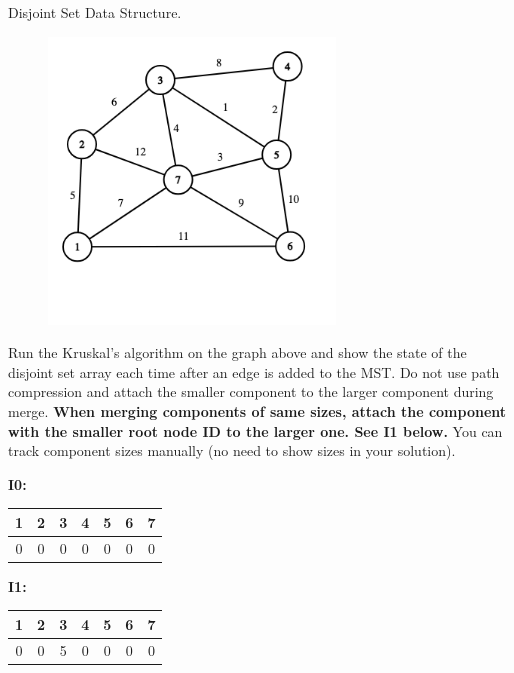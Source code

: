 \documentclass[12pt]{exam}
\newcommand{\stars}[1]{%
    \foreach \n in {1,...,#1}{%
        $\filledstar$%
    }%
}
\begin{document}
\begin{questions}
\begin{parts}
    \end{parts}
    \clearpage

    \question[10] [W5, \stars{1}] Disjoint Set Data Structure.

    \vspace*{-0.2cm}
    \begin{figure}[h]
        \center
        \includegraphics[width = 3in]{hw4-q3.png}
    \end{figure}

    \vspace*{-1.5cm}

    Run the Kruskal's algorithm on the graph above and show the state of the disjoint set array each time after an edge is added to the MST. Do not use path compression and attach the smaller component to the larger component during merge. {\bf When merging components of same sizes, attach the component with the smaller root node ID to the larger one. See I1 below.} You can track component sizes manually (no need to show sizes in your solution).

    \par{{\bf I0:}
        \begin{tabular}{|c|c|c|c|c|c|c|}
            \multicolumn{1}{c}{1} & \multicolumn{1}{c}{2} &
            \multicolumn{1}{c}{3} & \multicolumn{1}{c}{4} &
            \multicolumn{1}{c}{5} & \multicolumn{1}{c}{6} &
            \multicolumn{1}{c}{7}
            \\ \hline
            0                     & 0                     & 0 & 0 & 0 & 0 & 0 \\
            \hline
        \end{tabular}}

    \par{{\bf I1:}
        \begin{tabular}{|c|c|c|c|c|c|c|}
            \multicolumn{1}{c}{1} & \multicolumn{1}{c}{2} &
            \multicolumn{1}{c}{3} & \multicolumn{1}{c}{4} &
            \multicolumn{1}{c}{5} & \multicolumn{1}{c}{6} &
            \multicolumn{1}{c}{7}
            \\ \hline
            0                     & 0                     & 5 & 0 & 0 & 0 & 0 \\
            \hline
        \end{tabular}}


\end{questions}
\end{document}
